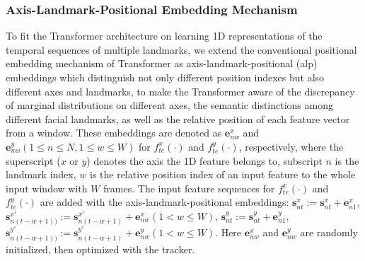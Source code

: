 \documentclass[review]{elsarticle}
\begin{document}
\subsubsection{Axis-Landmark-Positional Embedding Mechanism}
To fit the Transformer architecture on learning 1D representations of the temporal sequences of multiple landmarks, we extend the conventional positional embedding mechanism \cite{transformer} of Transformer as axis-landmark-positional (alp) embeddings which distinguish not only different position indexes but also different axes and landmarks, to make the Transformer aware of the discrepancy of marginal distributions on different axes, the semantic distinctions among different facial landmarks, as well as the relative position of each feature vector from a window. These embeddings are denoted as $\textbf{e}^{x}_{nw}$ and $\textbf{e}^{y}_{nw} (1 \leq n \leq N, 1 \leq w \leq W)$ for $f^x_{te}(\cdot)$ and $f^y_{te}(\cdot)$, respectively, where the superscript ($x$ or $y$) denotes the axis the 1D feature belongs to, subscript $n$ is the landmark index, $w$ is the relative position index of an input feature to the whole input window with $W$ frames.  The input feature sequences for $f^x_{te}(\cdot)$ and $f^y_{te}(\cdot)$ are added with the axis-landmark-positional embeddings: $\textbf{s}^{x}_{nt}:=\textbf{s}^{x}_{nt}+\textbf{e}^{x}_{n1}$, $\textbf{s}^{x'}_{n(t-w+1))}:=\textbf{s}^{x'}_{n(t-w+1)}+\textbf{e}^{x}_{nw} (1< w \leq W)$, $\textbf{s}^{y}_{nt}:=\textbf{s}^{y}_{nt}+\textbf{e}^{y}_{n1}$, $\textbf{s}^{y'}_{n(t-w+1))}:=\textbf{s}^{y'}_{n(t-w+1)}+\textbf{e}^{y}_{nw} (1< w \leq W)$. Here $\textbf{e}^{x}_{nw}$ and $\textbf{e}^{y}_{nw}$ are randomly initialized, then optimized with the tracker.

\end{document}
